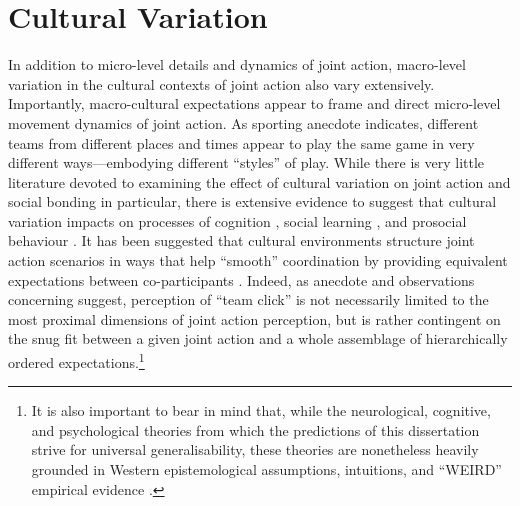 \section{Cultural Variation}
In addition to micro-level details and dynamics of joint action, macro-level variation in the cultural contexts of joint action also vary extensively. Importantly, macro-cultural expectations appear to frame and direct micro-level movement dynamics of joint action.  As sporting anecdote indicates, different teams from different places and times appear to play the same game in very different ways---embodying different ``styles'' of play.  While there is very little literature devoted to examining the effect of cultural variation on joint action and social bonding in particular, there is extensive evidence to suggest that cultural variation impacts on processes of cognition \citep{Nisbett2003,Hoshino-Browne2005}, social learning \citep{Mesoudi2015}, and prosocial behaviour \citep{Yuki2005,Yuki2003}.
It has been suggested that cultural environments structure joint action scenarios in ways that help ``smooth'' coordination by providing equivalent expectations between co-participants \citep{Vesper2017}.  Indeed, as anecdote and observations concerning suggest, perception of ``team click'' is not necessarily limited to the most proximal dimensions of joint action perception, but is rather contingent on the snug fit between a given joint action and a whole assemblage of hierarchically ordered expectations.\footnote{It is also important to bear in mind that, while the neurological, cognitive, and psychological theories from which the predictions of this dissertation strive for universal generalisability, these theories are nonetheless heavily grounded in Western epistemological assumptions, intuitions, and ``WEIRD'' empirical evidence \citep{Henrich2010a}.}

